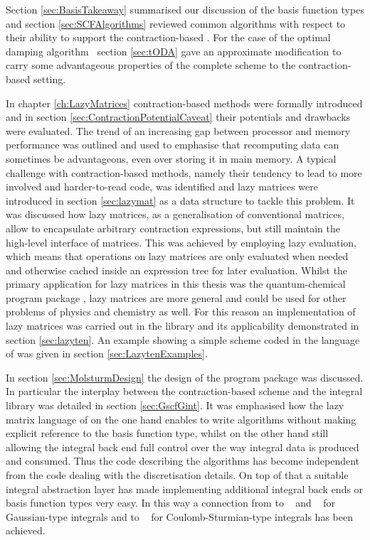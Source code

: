 Section \ref{sec:BasisTakeaway} summarised our discussion of the basis
function types and section \ref{sec:SCFAlgorithms}
reviewed common \SCF algorithms
with respect to their ability to support the contraction-based \SCF.
For the case of the optimal damping algorithm~\cite{Cances2000a}
section \ref{sec:tODA} gave an approximate modification
to carry some advantageous
properties of the complete scheme to the contraction-based setting.


In chapter \ref{ch:LazyMatrices} contraction-based methods
were formally introduced and in section \ref{sec:ContractionPotentialCaveat}
their potentials and drawbacks were evaluated.
The trend of an increasing gap between processor and memory performance
was outlined and used to emphasise that recomputing data
can sometimes be advantageous, even over storing it in main memory.
A typical challenge with contraction-based methods,
namely their tendency to lead to more involved and harder-to-read code,
was identified
and lazy matrices were introduced in section \ref{sec:lazymat}
as a data structure to tackle this problem.
It was discussed how lazy matrices, as a generalisation
of conventional matrices,
allow to encapsulate arbitrary contraction expressions,
but still maintain the high-level interface of matrices.
This was achieved by employing lazy evaluation,
which means that operations on lazy matrices are only
evaluated when needed
and otherwise cached inside an expression tree for later evaluation.
Whilst the primary application for lazy matrices in this thesis was the quantum-chemical
program package \molsturm,
lazy matrices are more general and could be used for other problems
of physics and chemistry as well.
For this reason an implementation of lazy matrices was carried out
in the \lazyten library
and its applicability demonstrated in section \ref{sec:lazyten}.
An example showing a simple \SCF scheme coded in the language of \lazyten
was given in section \ref{sec:LazytenExamples}.


In section \ref{sec:MolsturmDesign}
the design of the \molsturm program package was discussed.
In particular the interplay between
the contraction-based \SCF scheme and the integral library
was detailed in section \ref{sec:GscfGint}.
It was emphasised how the lazy matrix language of \lazyten
on the one hand
enables to write \SCF algorithms
without making explicit reference to the basis function type,
whilst on the other hand
still allowing the integral back end full
control over the way integral data is produced and consumed.
Thus the code describing
the \SCF algorithms has become independent from the code
dealing with the discretisation details.
On top of that a suitable integral abstraction layer
has made implementing additional integral back ends or basis function types very easy.
In this way a connection from \molsturm
to \libint~\cite{Libint2_231,Libint2} and \libcint~\cite{Sun2015}
for Gaussian-type integrals
and to \sturmint~\cite{sturmintWeb}
for Coulomb-Sturmian-type integrals has been achieved.

